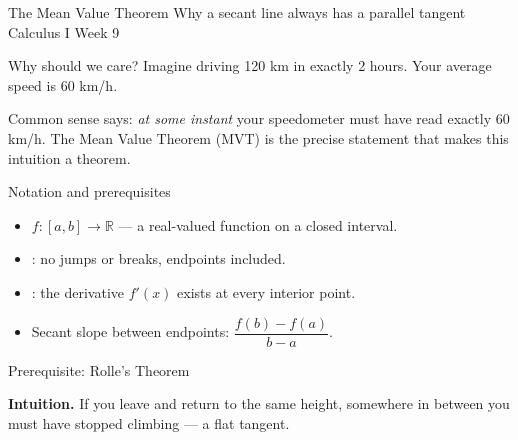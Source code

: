 \documentclass[aspectratio=169,10pt]{beamer}
\begin{document}
\TLtitlecenter
  {The Mean Value Theorem}
  {Why a secant line always has a parallel tangent}
  {Calculus I}
  {Week 9}


\begin{frame}{Why should we care?}
  Imagine driving 120 km in exactly 2 hours. Your average speed is 60 km/h.
  \medskip

  Common sense says: \emph{at some instant} your speedometer must have read
  exactly 60 km/h. The Mean Value Theorem (MVT) is the precise statement that
  makes this intuition a theorem.

\end{frame}


\begin{frame}{Notation and prerequisites}
  \begin{itemize}
    \item $f:[a,b]\to\mathbb{R}$ — a real-valued function on a closed interval.
    \item {}: no jumps or breaks, endpoints included.
    \item {}: the derivative $f'(x)$ exists at every interior point.
    \item Secant slope between endpoints: $\dfrac{f(b)-f(a)}{b-a}$.
  \end{itemize}

\end{frame}

\begin{frame}{Prerequisite: Rolle's Theorem}

  \textbf{Intuition.} If you leave and return to the same height, somewhere in
  between you must have stopped climbing — a flat tangent.
\end{frame}

\end{document}
